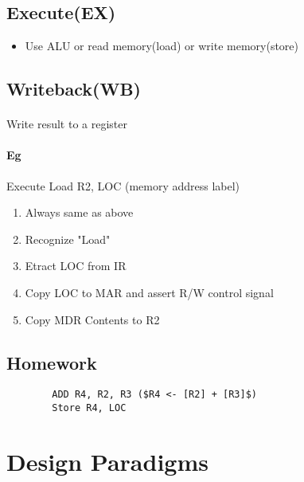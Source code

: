     \subsection{Execute(EX)}
      \begin{itemize}
        \item Use ALU or read memory(load) or write memory(store)
      \end{itemize}
    \subsection{Writeback(WB)}
      \paragraph{} Write result to a register
      \paragraph{Eg} Execute Load R2, LOC (memory address label)
      \begin{enumerate}
        \item Always same as above
        \item Recognize "Load"
        \item Etract LOC from IR
        \item Copy LOC to MAR and assert R/W control signal
        \item Copy MDR Contents to R2
      \end{enumerate}

    \subsection{Homework}
      \begin{lstlisting}
        ADD R4, R2, R3 ($R4 <- [R2] + [R3]$)
        Store R4, LOC
      \end{lstlisting}

  \section{Design Paradigms}
